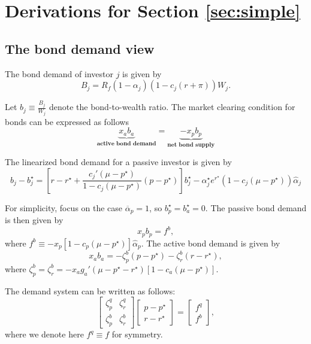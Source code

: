 \section{Derivations for Section \ref{sec:simple}}

\subsection{The bond demand view}

The bond demand of investor $j$ is given by 
\begin{equation}
    B_j = R_f (1-\alpha_j) (1-c_j(r+\pi)) W_j. 
\end{equation}

Let $b_j \equiv \frac{B_j}{W_j}$ denote the bond-to-wealth ratio. The market clearing condition for bonds can be expressed as follows
\begin{equation}
    \underbrace{x_a b_a}_{\textbf{active bond demand}} = \underbrace{- x_p b_p}_{\textbf{net bond supply}}
\end{equation}

The linearized bond demand for a passive investor is given by
\begin{equation}
    b_j - b_j^\star = \left[ r -r^\star +\frac{c_j'(\mu-p^\star)}{1-c_j(\mu-p^\star)}   (p-p^\star)\right] b_j^\star - \alpha_j^\star e^{r^\star} (1-c_j(\mu-p^\star))  \hat{\alpha}_j
\end{equation}

For simplicity, focus on the case $\overline{\alpha}_p = 1$, so $b^\star_p = b_a^\star = 0$. The passive bond demand is then given by 
\begin{equation}
    x_p b_p=  f^b,
\end{equation}
where $f^b \equiv  -x_p [1-c_p(\mu-p^\star)] \hat{\alpha}_p$. The active bond demand is given by
\begin{equation}
    x_a b_a  = -\zeta^b_p (p-p^\star) - \zeta^b_r (r-r^\star),
\end{equation}
where $\zeta^b_p = \zeta^b_r = -x_a g_a'(\mu-p^\star-r^\star)[1-c_a(\mu-p^\star)]$.

The demand system can be written as follows:
\begin{equation}
    \left[
    \begin{matrix}
        \zeta_p^q & \zeta^q_r\\
        \zeta_p^b & \zeta^b_r 
    \end{matrix}
    \right] \left[ 
    \begin{matrix}
        p-p^\star\\
        r-r^\star
    \end{matrix}
    \right] = \left[ 
    \begin{matrix}
        f^q\\
    f^b
    \end{matrix}
    \right],
\end{equation}
where we denote here $f^q \equiv f$ for symmetry. 

